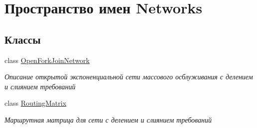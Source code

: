 \hypertarget{namespace_networks}{}\section{Пространство имен Networks}
\label{namespace_networks}
\subsection*{Классы}
\begin{DoxyCompactItemize}
\item 
class \hyperlink{class_networks_1_1_open_fork_join_network}{Open\+Fork\+Join\+Network}
\begin{DoxyCompactList}\small\item\em Описание открытой экспоненциальной сети массового осблуживания с делением и слиянием требований \end{DoxyCompactList}\item 
class \hyperlink{class_networks_1_1_routing_matrix}{Routing\+Matrix}
\begin{DoxyCompactList}\small\item\em Маршрутная матрица для сети с делением и слиянием требований \end{DoxyCompactList}\end{DoxyCompactItemize}
